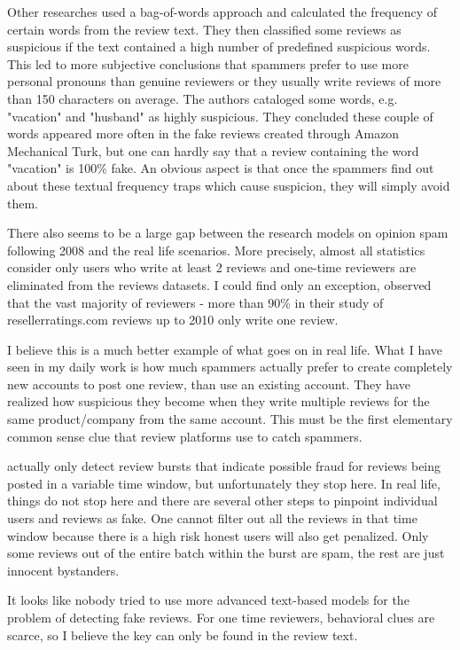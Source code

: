 Other researches \citet{Ott2011} used a bag-of-words approach and calculated the frequency of certain words from the review text. They then classified some reviews as suspicious if the text contained a high number of predefined suspicious words. This led to more subjective conclusions that spammers prefer to use more personal pronouns than genuine reviewers or they usually write reviews of more than 150 characters on average. The authors cataloged some words, e.g. "vacation" and "husband" as highly suspicious. They concluded these couple of words appeared more often in the fake reviews created through Amazon Mechanical Turk, but one can hardly say that a review containing the word "vacation" is 100\% fake. An obvious aspect is that once the spammers find out about these textual frequency traps which cause suspicion, they will simply avoid them.

There also seems to be a large gap between the research models on opinion spam following 2008 and the real life scenarios. More precisely, almost all statistics consider only users who write at least 2 reviews and one-time reviewers are eliminated from the reviews datasets. I could find only an exception, \citet{Xie2012} observed that the vast majority of reviewers - more than 90\% in their study of resellerratings.com reviews up to 2010 only write one review. 

I believe this is a much better example of what goes on in real life. What I have seen in my daily work is how much spammers actually prefer to create completely new accounts to post one review, than use an existing account. They have realized how suspicious they become when they write multiple reviews for the same product/company from the same account. This must be the first elementary common sense clue that review platforms use to catch spammers. 

\citet{Xie2012} actually only detect review bursts that indicate possible fraud for reviews being posted in a variable time window, but unfortunately they stop here. In real life, things do not stop here and there are several other steps to pinpoint individual users and reviews as fake. One cannot filter out all the reviews in that time window because there is a high risk honest users will also get penalized. Only some reviews out of the entire batch within the burst are spam, the rest are just innocent bystanders.

It looks like nobody tried to use more advanced text-based models for the problem of detecting fake reviews. For one time reviewers, behavioral clues are scarce, so I believe the key can only be found in the review text. 

